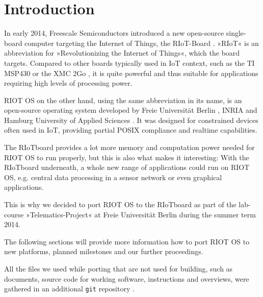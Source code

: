 \section{Introduction}
In early 2014, Freescale Semiconductors \cite{freescale-web} introduced a new 
open-source single-board computer targeting the Internet of Things, the 
RIoT-Board \cite{riot-web}. »RIoT« is an abbreviation for 
»Revolutionizing the Internet of Things«, which the board targets.
Compared to other boards typically used in IoT context, such as the TI MSP430 
\cite{msp430} or the XMC 2Go \cite{xmc}, it is quite powerful and thus suitable 
for applications requiring high levels of processing power.

RIOT OS \cite{riot-os} on the other hand, using the same abbreviation in its 
name, is an open-source operating system developed by Freie Universität Berlin 
\cite{fu-web}, INRIA \cite{inria-web} and Hamburg University of Applied 
Sciences \cite{haw-web}. It was designed for constrained devices often used in 
IoT, providing partial POSIX compliance and realtime capabilities.

The RIoTboard provides a lot more memory and computation power needed for RIOT 
OS to run properly, but this is also what makes it interesting: With the 
RIoTboard underneath, a whole new range of applications could run on RIOT OS, 
e.g. central data processing in a sensor network or even graphical applications.

This is why we decided to port RIOT OS to the RIoTboard as part of the 
lab-course »Telematics-Project« \cite{course-web} at Freie Universität Berlin 
during the summer term 2014.

The following sections will provide more information how to port RIOT OS to new 
platforms, planned milestones and our further proceedings.

All the files we used while porting that are not used for building, such as 
documents, source code for working software, instructions and overviews, were 
gathered in an additional \texttt{git} repository \cite{git-report}.
